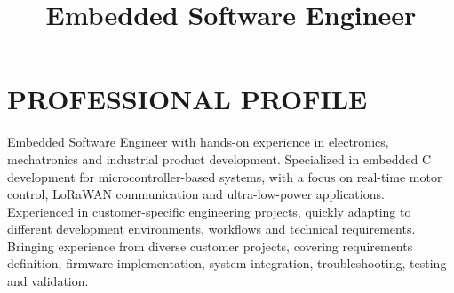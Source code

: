 \documentclass[10pt,a4paper,sans]{moderncv}
\title{Embedded Software Engineer}
\begin{document}
    \setcounter{page}{1}
    \makecvtitle

    \section{PROFESSIONAL PROFILE}
    Embedded Software Engineer with hands-on experience in electronics, mechatronics and industrial product development.
    Specialized in embedded C development for microcontroller-based systems, with a focus on real-time motor control, LoRaWAN communication and ultra-low-power applications.
    Experienced in customer-specific engineering projects, quickly adapting to different development environments, workflows and technical requirements. Bringing experience from diverse customer projects, covering requirements definition, firmware implementation, system integration, troubleshooting, testing and validation.
\end{document}
